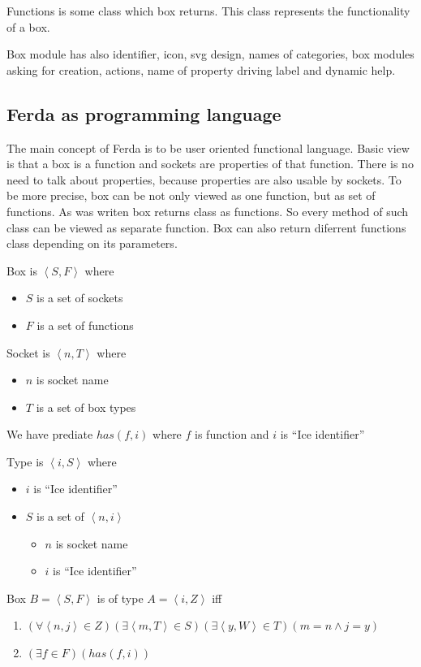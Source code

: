 \documentclass{article}
\begin{document}
Functions is some class which box returns. This class represents the functionality of a box.

Box module has also identifier, icon, svg design, names of categories, box modules asking for creation, actions, name of property driving label and dynamic help.

\subsection{Ferda as programming language}
The main concept of Ferda is to be user oriented functional language. Basic view is that a box is a function and sockets are properties of that function. There is no need to talk about properties, because properties are also usable by sockets. To be more precise, box can be not only viewed as one function, but as set of functions. As was writen box returns class as functions. So every method of such class can be viewed as separate function. Box can also return diferrent functions class depending on its parameters. 

Box is $\left<S,F\right>$ where
\begin{itemize}
	\item $S$ is a set of sockets
	\item $F$ is a set of functions
\end{itemize}
	
Socket is $\left<n,T\right>$ where
\begin{itemize}
	\item $n$ is socket name
	\item $T$ is a set of box types
\end{itemize}

We have prediate $has(f,i)$ where $f$ is function and $i$ is ``Ice identifier''

Type is $\left<i,S\right>$ where
\begin{itemize}
	\item $i$ is ``Ice identifier''
	\item $S$ is a set of $\left<n,i\right>$
	\begin{itemize}
		\item $n$ is socket name
		\item $i$ is ``Ice identifier''
	\end{itemize}
\end{itemize}

Box $B=\left<S,F\right>$ is of type $A=\left<i,Z\right>$ iff 
\begin{enumerate}
	\item $(\forall \left<n,j\right>\in Z)(\exists \left<m,T\right>\in S)(\exists \left<y,W\right>\in T)(m=n \wedge j=y)$
	\item $(\exists f\in F)(has(f,i))$
\end{enumerate}
	
\end{document}
